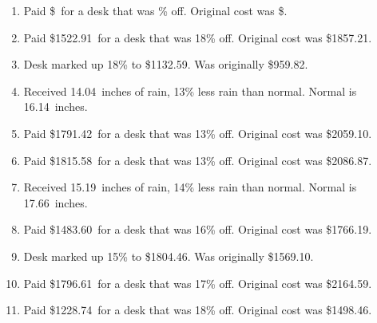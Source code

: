 \documentclass[12pt]{amsart}
\begin{document}
\begin{enumerate}
\item Paid \$\paid\ for a desk that was \discount\% off. Original cost was \$\orcost. 
\def \discount{18}\def \paid{1522.91}\def \rainy{11.69}\def \orcost{1857.21}\def \purcost{1290.60}\def \orrainy{14.26}
\item Paid \$\paid\ for a desk that was \discount\% off. Original cost was \$\orcost. 
\def \discount{18}\def \paid{1132.59}\def \rainy{12.13}\def \orcost{1381.21}\def \purcost{959.82}\def \orrainy{14.79}
\item Desk marked up \discount\% to \$\paid. Was originally \$\purcost. 
\def \discount{13}\def \paid{1632.77}\def \rainy{14.04}\def \orcost{1876.75}\def \purcost{1444.93}\def \orrainy{16.14}
\item Received \rainy\ inches of rain, \discount\% less rain than normal. Normal is \orrainy\ inches.
\def \discount{13}\def \paid{1791.42}\def \rainy{10.86}\def \orcost{2059.10}\def \purcost{1585.33}\def \orrainy{12.48}
\item Paid \$\paid\ for a desk that was \discount\% off. Original cost was \$\orcost. 
\def \discount{13}\def \paid{1815.58}\def \rainy{9.52}\def \orcost{2086.87}\def \purcost{1606.71}\def \orrainy{10.94}
\item Paid \$\paid\ for a desk that was \discount\% off. Original cost was \$\orcost. 
\def \discount{14}\def \paid{1391.07}\def \rainy{15.19}\def \orcost{1617.52}\def \purcost{1220.24}\def \orrainy{17.66}
\item Received \rainy\ inches of rain, \discount\% less rain than normal. Normal is \orrainy\ inches.
\def \discount{16}\def \paid{1483.60}\def \rainy{10.34}\def \orcost{1766.19}\def \purcost{1278.97}\def \orrainy{12.31}
\item Paid \$\paid\ for a desk that was \discount\% off. Original cost was \$\orcost. 
\def \discount{15}\def \paid{1804.46}\def \rainy{13.83}\def \orcost{2122.89}\def \purcost{1569.10}\def \orrainy{16.27}
\item Desk marked up \discount\% to \$\paid. Was originally \$\purcost. 
\def \discount{17}\def \paid{1796.61}\def \rainy{9.24}\def \orcost{2164.59}\def \purcost{1535.56}\def \orrainy{11.13}
\item Paid \$\paid\ for a desk that was \discount\% off. Original cost was \$\orcost. 
\def \discount{18}\def \paid{1228.74}\def \rainy{14.55}\def \orcost{1498.46}\def \purcost{1041.31}\def \orrainy{17.74}
\item Paid \$\paid\ for a desk that was \discount\% off. Original cost was \$\orcost. 
\def \discount{16}\def \paid{1466.78}\def \rainy{9.63}\def \orcost{1746.17}\def \purcost{1264.47}\def \orrainy{11.46}

\end{enumerate}
\end{document}
